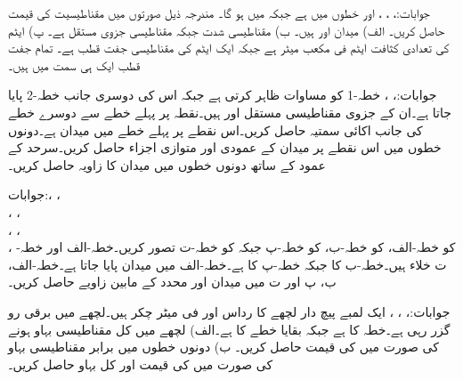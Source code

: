 جوابات:، ، ،  اور  خطوں میں  ہے جبکہ  میں  ہو گا۔
مندرجہ ذیل صورتوں میں مقناطیسیت  کی قیمت  حاصل کریں۔ الف) میدان  اور  ہیں۔ ب) مقناطیسی 
شدت  جبکہ مقناطیسی جزوی مستقل  ہے۔ پ) ایٹم کی تعدادی کثافت  ایٹم فی مکعب میٹر ہے جبکہ ایک ایٹم کی مقناطیسی جفت قطب  ہے۔ تمام جفت قطب ایک ہی سمت میں ہیں۔

جوابات:، ، 
خطہ-1 کو مساوات  ظاہر کرتی ہے جبکہ اس کی دوسری جانب خطہ-2 پایا جاتا ہے۔ان کے جزوی مقناطیسی مستقل  اور  ہیں۔نقطہ  پر پہلے خطے سے دوسرے خطے کی جانب اکائی سمتیہ حاصل کریں۔اس نقطے پر پہلے خطے میں میدان
  ہے۔دونوں خطوں میں اس نقطے پر میدان کے عمودی اور متوازی اجزاء حاصل کریں۔سرحد کے عمود کے ساتھ دونوں خطوں میں میدان کا زاویہ حاصل کریں۔

جوابات:، ، \\ 
 ، ، \\
 ، ، \\
،  
 کو خطہ-الف،  کو خطہ-ب،  کو خطہ-پ جبکہ  کو خطہ-ت تصور کریں۔خطہ-الف اور خطہ-ت خلاء ہیں۔خطہ-ب کا   جبکہ خطہ-پ کا  ہے۔خطہ-الف میں میدان  پایا جاتا ہے۔خطہ-الف، ب، پ اور ت میں میدان اور  محدد کے مابین زاویے حاصل کریں۔

جوابات:، ، ، 
ایک لمبے پیچ دار لچھے کا رداس  اور فی میٹر چکر  ہیں۔لچھے میں  برقی رو گزر رہی ہے۔خطہ  کا  ہے جبکہ بقایا خطے  کا  ہے۔الف) لچھے میں کل مقناطیسی بہاو  ہونے کی صورت میں  کی قیمت حاصل کریں۔ ب) دونوں خطوں میں برابر مقناطیسی بہاو کی صورت میں  کی قیمت اور کل بہاو حاصل کریں۔ 

